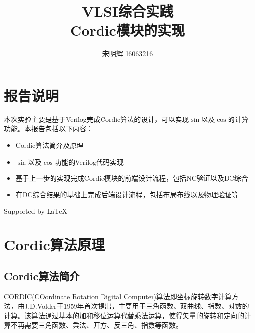 \documentclass[a4paper,12pt]{report}
\title{VLSI综合实践\\
Cordic模块的实现}
\author{\href{ song_mh@yeah.net}{宋明辉  16063216}}
\begin{document}
\maketitle
\tableofcontents


\chapter*{报告说明}
本次实验主要是基于Verilog完成Cordic算法的设计，可以实现$\sin$以及$\cos$的计算功能。本报告包括以下内容：
\begin{itemize}
\item Cordic算法简介及原理
\item $\sin$以及$\cos$功能的Verilog代码实现
\item 基于上一步的实现完成Cordic模块的前端设计流程，包括NC验证以及DC综合
\item 在DC综合结果的基础上完成后端设计流程，包括布局布线以及物理验证等
\end{itemize}
{
\raggedleft
Supported by \LaTeX
}


\chapter{Cordic算法原理}
\section{Cordic算法简介}
CORDIC(COordinate Rotation Digital Computer)算法即坐标旋转数字计算方法，由J.D.Volder于1959年首次提出\cite{volder1959cordic}，主要用于三角函数、双曲线、指数、对数的计算。该算法通过基本的加和移位运算代替乘法运算，使得矢量的旋转和定向的计算不再需要三角函数、乘法、开方、反三角、指数等函数。
\end{document}
